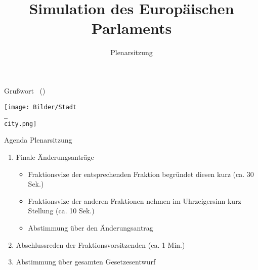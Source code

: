 \documentclass{beamer}
\title{Simulation des Europäischen Parlaments}
\subtitle{Plenarsitzung}
\begin{document}
\frame{\titlepage}

\begin{frame}{Grußwort \stadtvertreter\ (\stadtvertreterOffice)}
\vspace{-1.5cm}
    \begin{center}
        \texttt{[image: Bilder/Stadt\\\_\\city.png]}
    \end{center}
\end{frame}

\begin{frame}{Agenda Plenarsitzung}
\vspace{-1.5cm}
    \begin{enumerate}
        \item Finale Änderungsanträge
        \begin{itemize}
            \item Fraktionsvize der entsprechenden Fraktion begründet diesen kurz (ca. 30 Sek.)
            \item Fraktionsvize der anderen Fraktionen nehmen im Uhrzeigersinn kurz Stellung (ca. 10 Sek.)
            \item Abstimmung über den Änderungsantrag
        \end{itemize}
        \item Abschlussreden der Fraktionsvorsitzenden (ca. 1 Min.)
        \item Abstimmung über gesamten Gesetzesentwurf
    \end{enumerate}
\end{frame}
\end{document}
